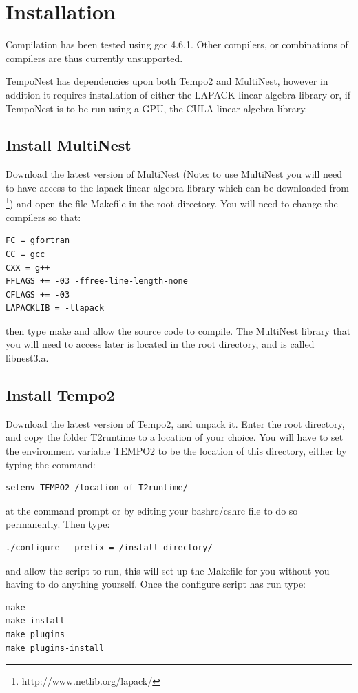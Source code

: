 \documentclass[%
 preprint,
 amsmath,amssymb,amsfonts,
 aps,
]{revtex4-1}
\begin{document}
\section{Installation}
\label{Section:Install}
Compilation has been tested using gcc 4.6.1.  Other compilers, or combinations of compilers are thus currently unsupported.

TempoNest has dependencies upon both Tempo2 and MultiNest, however in addition it requires installation of either the LAPACK linear algebra library or, if TempoNest is to be run using a GPU, the CULA linear algebra library.

\subsection{Install MultiNest}
Download the latest version of MultiNest (Note: to use MultiNest you will need to have access to the lapack linear algebra library which can be downloaded from \footnote{http://www.netlib.org/lapack/})  and open the file Makefile in the root directory.    You will need to change the compilers so that:
%

\begin{lstlisting}
FC = gfortran
CC = gcc
CXX = g++
FFLAGS += -03 -ffree-line-length-none
CFLAGS += -03
LAPACKLIB = -llapack

\end{lstlisting}


%
then type make and allow the source code to compile.  The MultiNest library that you will need to access later is located in the root directory, and is called libnest3.a.

\subsection{Install Tempo2}

Download the latest version of Tempo2, and unpack it. Enter the root directory, and copy the folder T2runtime to a location of your choice.  You will have to set the environment variable TEMPO2 to be the location of this directory, either by typing the command:
%
\begin{lstlisting}
setenv TEMPO2 /location of T2runtime/
\end{lstlisting}
%
at the command prompt or by editing your bashrc/cshrc file to do so permanently.  Then type:
\begin{lstlisting}
./configure --prefix = /install directory/
\end{lstlisting}
 and allow the script to run, this will set up the Makefile for you without you having to do anything yourself.  Once the configure script has run type:
\begin{lstlisting}
make
make install
make plugins
make plugins-install
\end{lstlisting}
\end{document}

